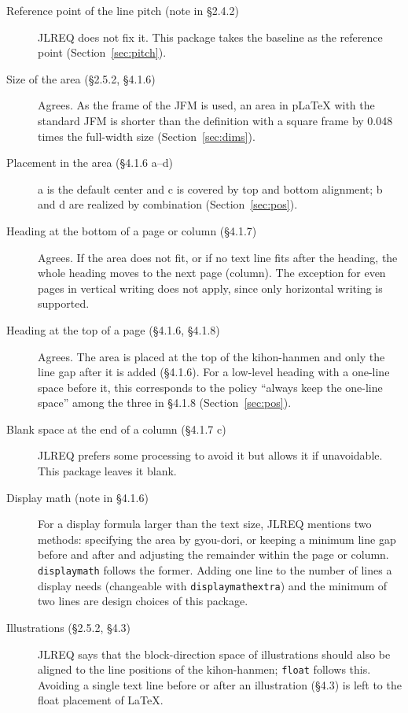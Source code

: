\documentclass[paper=a4,dvipdfmx]{jlreq}
\newcommand\opt[1]{\texttt{#1}}
\begin{document}
\begin{description}
\item[Reference point of the line pitch (note in \S2.4.2)] JLREQ does not fix it.
  This package takes the baseline as the reference point
  (Section~\ref{sec:pitch}).
\item[Size of the area (\S2.5.2, \S4.1.6)] Agrees. As the frame of the JFM is
  used, an area in pLaTeX with the standard JFM is shorter than the definition
  with a square frame by 0.048 times the full-width size (Section~\ref{sec:dims}).
\item[Placement in the area (\S4.1.6 a--d)] a is the default center and c is
  covered by top and bottom alignment; b and d are realized by combination
  (Section~\ref{sec:pos}).
\item[Heading at the bottom of a page or column (\S4.1.7)] Agrees. If the area
  does not fit, or if no text line fits after the heading, the whole heading
  moves to the next page (column). The exception for even pages in vertical
  writing does not apply, since only horizontal writing is supported.
\item[Heading at the top of a page (\S4.1.6, \S4.1.8)] Agrees. The area is
  placed at the top of the kihon-hanmen and only the line gap after it is added
  (\S4.1.6). For a low-level heading with a one-line space before it, this
  corresponds to the policy ``always keep the one-line space'' among the three
  in \S4.1.8
  (Section~\ref{sec:pos}).
\item[Blank space at the end of a column (\S4.1.7 c)] JLREQ prefers some
  processing to avoid it but allows it if unavoidable. This package leaves it
  blank.
\item[Display math (note in \S4.1.6)] For a display formula larger than the
  text size, JLREQ mentions two methods: specifying the area by gyou-dori, or
  keeping a minimum line gap before and after and adjusting the remainder within
  the page or column. \opt{displaymath} follows the former. Adding one line to
  the number of lines a display needs (changeable with \opt{displaymathextra})
  and the minimum of two lines are design choices of this package.
\item[Illustrations (\S2.5.2, \S4.3)] JLREQ says that the block-direction space
  of illustrations should also be aligned to the line positions of the
  kihon-hanmen; \opt{float} follows this. Avoiding a single text line before or
  after an illustration (\S4.3) is left to the float placement of \LaTeX.
\end{description}
\end{document}
